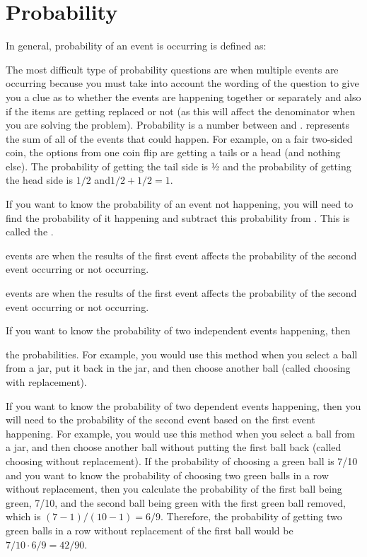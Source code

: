 \vfill
\newpage
\section{Probability}

In general, probability of an event is occurring is defined as:

\vfill
The most difficult type of probability questions are when multiple events are occurring because you must take into account the wording of the question to give you a clue as to whether the events are happening together or separately and also if the items are getting replaced or not (as this will affect the denominator when you are solving the problem). 
Probability is a number between \shortline and \shortline. \shortline represents the sum of all of the events that could happen. For example, on a fair two-sided coin, the options from one coin flip are getting a tails or a head (and nothing else). The probability of getting the tail side is ½ and the probability of getting the head side is $1/2$ and$1/2 + 1/2 =1$.

\vfill
If you want to know the probability of an event not happening, you will need to find the probability of it happening and subtract this probability from \shortline. This is called the \longline.

\vfill
\longline events are when the results of the first event affects the probability of the second event occurring or not occurring.

\vfill
\longline events are when the results of the first event affects the probability of the second event occurring or not occurring.

\vfill
If you want to know the probability of two independent events happening, then

\longline the probabilities. For example, you would use this method when you select a ball from a jar, put it back in the jar, and then choose another ball (called choosing with replacement).

\vfill
If you want to know the probability of two dependent events happening, then you will need to \longline the probability of the second event based on the first event happening. For example, you would use this method when you select a ball from a jar, and then choose another ball without putting the first ball back (called choosing without replacement).  If the probability of choosing a green ball is 7/10 and you want to know the probability of choosing two green balls in a row without replacement, then you calculate the probability of the first ball being green, 7/10, and the second ball being green with the first green ball removed, which is $(7 - 1)/(10 - 1) = 6/9$. Therefore, the probability of getting two green balls in a row without replacement of the first ball would be $7/10 \cdot 6/9 = 42/90$.

